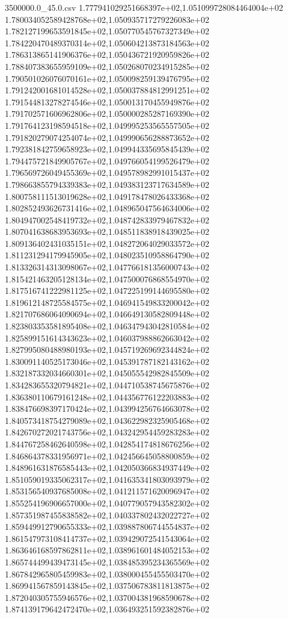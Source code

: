 \begin{filecontents*}{3500000.0_45.0.csv}
1.777941029251668397e+02,1.051099728084464004e+02
1.780034052589428768e+02,1.050935717279226083e+02
1.782127199653591845e+02,1.050770545767327349e+02
1.784220470489370314e+02,1.050604213873184563e+02
1.786313865141906376e+02,1.050436721920959826e+02
1.788407383655959109e+02,1.050268070234915285e+02
1.790501026076070161e+02,1.050098259139476795e+02
1.791242001681014528e+02,1.050037884812991251e+02
1.791544813278274546e+02,1.050013170455949876e+02
1.791702571606962806e+02,1.050000285287169390e+02
1.791764123198594518e+02,1.049995253565557505e+02
1.791820279074254074e+02,1.049990656288873652e+02
1.792381842759658923e+02,1.049944335695845439e+02
1.794475721849905767e+02,1.049766054199526479e+02
1.796569726049455369e+02,1.049578982991015437e+02
1.798663855794339383e+02,1.049383123717634589e+02
1.800758111513019628e+02,1.049178478026433368e+02
1.802852493626731416e+02,1.048965047564634006e+02
1.804947002548419732e+02,1.048742833979467832e+02
1.807041638683953693e+02,1.048511838918439025e+02
1.809136402431035151e+02,1.048272064029033572e+02
1.811231294179945905e+02,1.048023510958864790e+02
1.813326314313098067e+02,1.047766181356000743e+02
1.815421463205128134e+02,1.047500076868554970e+02
1.817516741222981125e+02,1.047225199144695580e+02
1.819612148725584575e+02,1.046941549833200042e+02
1.821707686064090694e+02,1.046649130582809448e+02
1.823803353581895408e+02,1.046347943042810584e+02
1.825899151614343623e+02,1.046037988862663042e+02
1.827995080488980193e+02,1.045719269692344824e+02
1.830091140525173046e+02,1.045391787182143162e+02
1.832187332034660301e+02,1.045055542982845509e+02
1.834283655320794821e+02,1.044710538745675876e+02
1.836380110679161248e+02,1.044356776122203883e+02
1.838476698397170424e+02,1.043994256764663078e+02
1.840573418754279089e+02,1.043622982325905468e+02
1.842670272021743756e+02,1.043242954459283283e+02
1.844767258462640598e+02,1.042854174818676256e+02
1.846864378331956971e+02,1.042456645058800859e+02
1.848961631876585443e+02,1.042050366834937449e+02
1.851059019335062317e+02,1.041635341803093979e+02
1.853156540937685008e+02,1.041211571620096947e+02
1.855254196906657000e+02,1.040779057943582302e+02
1.857351987455838582e+02,1.040337802432022727e+02
1.859449912790655333e+02,1.039887806744554837e+02
1.861547973108414737e+02,1.039429072541543064e+02
1.863646168597862811e+02,1.038961601484052153e+02
1.865744499439473145e+02,1.038485395234365569e+02
1.867842965805459983e+02,1.038000455455503470e+02
1.869941567859143845e+02,1.037506783811813875e+02
1.872040305755946576e+02,1.037004381968590678e+02
1.874139179642472470e+02,1.036493251592382876e+02

\end{filecontents*}
